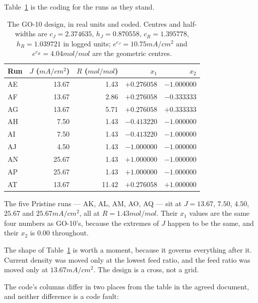 Table~\ref{tab:coded} is the coding for the runs as they stand.

\begin{table}[htbp]
  \centering
  \caption{The GO-10 design, in real units and coded. Centres and half-widths are
           $c_J = 2.374635$, $h_J = 0.870558$, $c_R = 1.395778$, $h_R = 1.039721$ in logged
           units; $e^{c_J} = 10.75\unit{mA/cm^2}$ and $e^{c_R} = 4.04\unit{mol/mol}$ are the
           geometric centres.}
  \label{tab:coded}
  \begin{tabular}{@{}lrrrr@{}}
    \toprule
    Run & $J$ ($\unit{mA/cm^2}$) & $R$ ($\unit{mol/mol}$) & $x_1$ & $x_2$ \\
    \midrule
    AE & 13.67 &  1.43 & $+0.276058$ & $-1.000000$ \\
    AF & 13.67 &  2.86 & $+0.276058$ & $-0.333333$ \\
    AG & 13.67 &  5.71 & $+0.276058$ & $+0.333333$ \\
    AH &  7.50 &  1.43 & $-0.413220$ & $-1.000000$ \\
    AI &  7.50 &  1.43 & $-0.413220$ & $-1.000000$ \\
    AJ &  4.50 &  1.43 & $-1.000000$ & $-1.000000$ \\
    AN & 25.67 &  1.43 & $+1.000000$ & $-1.000000$ \\
    AP & 25.67 &  1.43 & $+1.000000$ & $-1.000000$ \\
    AT & 13.67 & 11.42 & $+0.276058$ & $+1.000000$ \\
    \bottomrule
  \end{tabular}
\end{table}

The five Pristine runs --- AK, AL, AM, AO, AQ --- sit at $J = 13.67$, $7.50$, $4.50$, $25.67$
and $25.67\unit{mA/cm^2}$, all at $R = 1.43\unit{mol/mol}$. Their $x_1$ values are the same four
numbers as GO-10's, because the extremes of $J$ happen to be the same, and their $x_2$ is $0.00$
throughout.

The shape of Table~\ref{tab:coded} is worth a moment, because it governs everything after it.
Current density was moved only at the lowest feed ratio, and the feed ratio was moved only at
$13.67\unit{mA/cm^2}$. The design is a cross, not a grid.

The code's columns differ in two places from the table in the agreed
document, and neither difference is a code fault:

